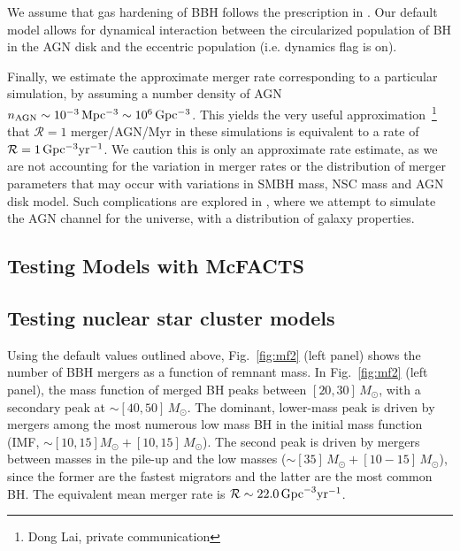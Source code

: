  We assume that gas hardening of BBH follows the prescription in \citet{Baruteau11}. Our default model allows for dynamical interaction between the circularized population of BH in the AGN disk and the eccentric population (i.e. dynamics flag is on). 

Finally, we estimate the approximate merger rate corresponding to a particular simulation, by assuming a number density of AGN $n_{\rm AGN} \sim 10^{-3} \,{\rm Mpc^{-3}} \sim 10^{6} \,{\rm Gpc^{-3}}$. This yields the very useful approximation~\footnote{ Dong Lai, private communication} that $\mathcal{R}=1$ merger/AGN/Myr in these simulations is equivalent to a rate of $\mathcal{R}=1\,{\rm Gpc^{-3} yr^{-1}}$. We caution this is only an approximate rate estimate, as we are not accounting for the variation in merger rates or the distribution of merger parameters that may occur with variations in SMBH mass, NSC mass and AGN disk model. Such complications are explored in \citet{Delfavero+25-mcfactsIII}, where we attempt to simulate the AGN channel for the universe, with a distribution of galaxy properties.

\subsection{Testing Models with McFACTS}
\label{sec:mcfacts-testing}

\subsection{Testing nuclear star cluster models}
Using the default values outlined above, Fig.~\ref{fig:mf2} (left panel) shows the number of BBH mergers as a function of remnant mass.
In Fig.~\ref{fig:mf2} (left panel), the mass function of merged BH peaks between $[20,30]\,M_{\odot}$, with a secondary peak at $\sim [40,50]\,M_{\odot}$. The dominant, lower-mass peak is driven by mergers among the most numerous low mass BH in the initial mass function (IMF, $\sim [10,15]M_{\odot}+[10,15]\,M_{\odot}$). The second peak is driven by mergers between masses in the pile-up and the low masses ($\sim [35]\,M_{\odot} + [10-15]\,M_{\odot}$), since the former are the fastest migrators and the latter are the most common BH. The equivalent mean merger rate is $\mathcal{R}\sim 22.0\,{\rm Gpc}^{-3}{\rm yr}^{-1}$.

